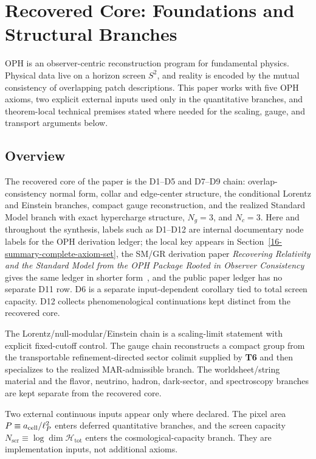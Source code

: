 \section{Recovered Core: Foundations and Structural Branches}\label{observer-patch-holography}

OPH is an observer-centric reconstruction program for fundamental physics. Physical data live on a horizon screen \(S^2\), and reality is encoded by the mutual consistency of overlapping patch descriptions. This paper works with five OPH axioms, two explicit external inputs used only in the quantitative branches, and theorem-local technical premises stated where needed for the scaling, gauge, and transport arguments below.

\subsection{Overview}\label{overview}

The recovered core of the paper is the D1--D5 and D7--D9 chain: overlap-consistency normal form, collar and edge-center structure, the conditional Lorentz and Einstein branches, compact gauge reconstruction, and the realized Standard Model branch with exact hypercharge structure, \(N_g=3\), and \(N_c=3\). Here and throughout the synthesis, labels such as D1--D12 are internal documentary node labels for the OPH derivation ledger; the local key appears in Section~\ref{16-summary-complete-axiom-set}, the SM/GR derivation paper \emph{Recovering Relativity and the Standard Model from the OPH Package Rooted in Observer Consistency} gives the same ledger in shorter form~\cite{ophcompact}, and the public paper ledger has no separate D11 row. D6 is a separate input-dependent corollary tied to total screen capacity. D12 collects phenomenological continuations kept distinct from the recovered core.

The Lorentz/null-modular/Einstein chain is a scaling-limit statement with explicit fixed-cutoff control. The gauge chain reconstructs a compact group from the transportable refinement-directed sector colimit supplied by \textbf{T6} and then specializes to the realized MAR-admissible branch. The worldsheet/string material and the flavor, neutrino, hadron, dark-sector, and spectroscopy branches are kept separate from the recovered core.

Two external continuous inputs appear only where declared. The pixel area \(P \equiv a_{\rm cell}/\ell_P^2\) enters deferred quantitative branches, and the screen capacity \(N_{\mathrm{scr}} \equiv \log \dim \mathcal H_{\mathrm{tot}}\) enters the cosmological-capacity branch. They are implementation inputs, not additional axioms.

